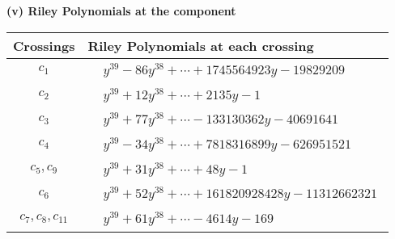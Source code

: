 \documentclass[1p]{elsarticle_modified}
\theoremstyle{definition}
\begin{document}
\newpage\renewcommand{\arraystretch}{1}
\flushleft \textbf{(v) Riley Polynomials at the component}\newline \\
\begin{tabular}{m{50pt}|m{274pt}}
Crossings & \hspace{64pt}Riley Polynomials at each crossing \\
\hline $$\begin{aligned}c_{1}\end{aligned}$$&$\begin{aligned}
&y^{39}-86 y^{38}+\cdots+1745564923 y-19829209
\end{aligned}$\\
\hline $$\begin{aligned}c_{2}\end{aligned}$$&$\begin{aligned}
&y^{39}+12 y^{38}+\cdots+2135 y-1
\end{aligned}$\\
\hline $$\begin{aligned}c_{3}\end{aligned}$$&$\begin{aligned}
&y^{39}+77 y^{38}+\cdots-133130362 y-40691641
\end{aligned}$\\
\hline $$\begin{aligned}c_{4}\end{aligned}$$&$\begin{aligned}
&y^{39}-34 y^{38}+\cdots+7818316899 y-626951521
\end{aligned}$\\
\hline $$\begin{aligned}c_{5},c_{9}\end{aligned}$$&$\begin{aligned}
&y^{39}+31 y^{38}+\cdots+48 y-1
\end{aligned}$\\
\hline $$\begin{aligned}c_{6}\end{aligned}$$&$\begin{aligned}
&y^{39}+52 y^{38}+\cdots+161820928428 y-11312662321
\end{aligned}$\\
\hline $$\begin{aligned}c_{7},c_{8},c_{11}\end{aligned}$$&$\begin{aligned}
&y^{39}+61 y^{38}+\cdots-4614 y-169
\end{aligned}$\\

\end{tabular}
\end{document}
